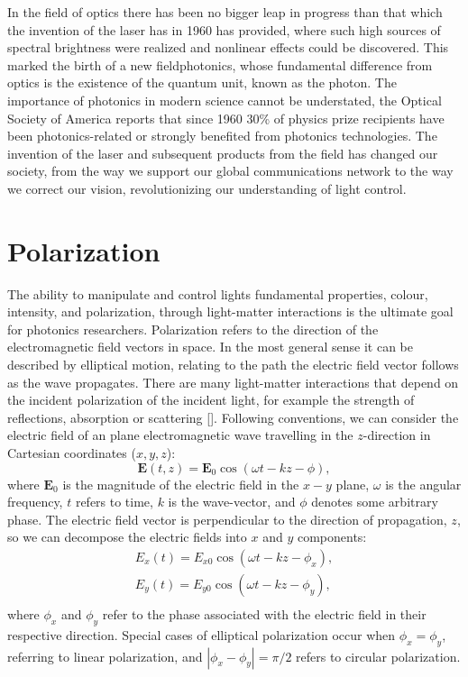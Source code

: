 In the field of optics there has been no bigger leap in progress than that which the invention of the laser has in 1960 has provided, where such high sources of spectral brightness were realized and nonlinear effects could be discovered. This marked the birth of a new field\textemdash photonics, whose fundamental difference from optics is the existence of the quantum unit, known as the photon. The importance of photonics in modern science cannot be understated, the Optical Society of America reports that since 1960 30\% of physics prize recipients have been photonics-related or strongly benefited from photonics technologies. The invention of the laser and subsequent products from the field has changed our society, from the way we support our global communications network to the way we correct our vision, revolutionizing our understanding of light control. 

\section{Polarization}
The ability to manipulate and control lights fundamental properties, colour, intensity, and polarization, through light-matter interactions is the ultimate goal for photonics researchers. Polarization refers to the direction of the electromagnetic field vectors in space. In the most general sense it can be described by elliptical motion, relating to the path the electric field vector follows as the wave propagates. There are many light-matter interactions that depend on the incident polarization of the incident light, for example the strength of reflections, absorption or scattering [\cite{Hulst}]. Following conventions, we can consider the electric field of an plane electromagnetic wave travelling in the $z$-direction in Cartesian coordinates ($x,y,z$):
\begin{equation}
\mathbf{E}(t, z) =\mathbf{E}_0 \cos(\omega t-kz-\phi),
\end{equation}where $\mathbf{E}_0$ is the magnitude of the electric field in the $x-y$ plane, $\omega$ is the angular frequency, $t$ refers to time, $k$ is the wave-vector, and $\phi$ denotes some arbitrary phase. The electric field vector is perpendicular to the direction of propagation, $z$, so we can decompose the electric fields into $x$ and $y$ components:
\begin{equation}
\begin{aligned}
E_x(t) = E_{x0} \cos(\omega t-kz-\phi_x),\\
E_y(t) = E_{y0} \cos(\omega t-kz-\phi_y),\\
\end{aligned}
\end{equation}
where $\phi_x$ and $\phi_y$ refer to the phase associated with the electric field in their respective direction. Special cases of elliptical polarization occur when $\phi_x = \phi_y$, referring to linear polarization, and $|\phi_x-\phi_y| = \pi/2$ refers to circular polarization.


